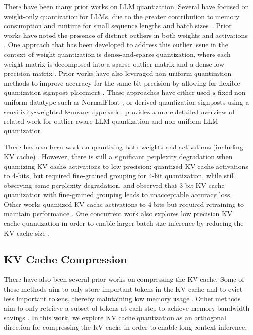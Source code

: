 There have been many prior works on LLM quantization. Several have focused on weight-only quantization for LLMs, due to the greater contribution to memory consumption and runtime for small sequence lengths and batch sizes~\cite{lin2023awq,dettmers2023spqr,kim2023squeezellm}. Prior works have noted the presence of distinct outliers in both weights and activations \cite{dettmers2022llm,dettmers2023spqr,kim2023squeezellm}. One approach that has been developed to address this outlier issue in the context of weight quantization is dense-and-sparse quantization, where each weight matrix is decomposed into a sparse outlier matrix and a dense low-precision matrix \cite{dettmers2023spqr,kim2023squeezellm}. Prior works have also leveraged non-uniform quantization methods to improve accuracy for the same bit precision by allowing for flexible quantization signpost placement \cite{kim2023squeezellm,dettmers2023qlora}. These approaches have either used a fixed non-uniform datatype such as NormalFloat \cite{dettmers2023qlora}, or derived quantization signposts using a sensitivity-weighted k-means approach \cite{kim2023squeezellm}.
 provides a more detailed overview of related work for outlier-aware LLM quantization and non-uniform  LLM quantization.

There has also been work on quantizing both weights and activations (including KV cache) \cite{xiao2023smoothquant,shao2023omniquant}. However, there is still a significant perplexity degradation when quantizing KV cache activations to low precision; \cite{sheng2023flexgen,zhao2023atom} quantized KV cache activations to 4-bits, but required fine-grained grouping for 4-bit quantization, while still observing some perplexity degradation, and \cite{sheng2023flexgen} observed that 3-bit KV cache quantization with fine-grained grouping leads to unacceptable accuracy loss. Other works quantized KV cache activations to 4-bits but required retraining to maintain performance \cite{liu2023llmqat}. One concurrent work also explores low precision KV cache quantization in order to enable larger batch size inference by reducing the KV cache size \cite{kivi}.

\subsection{KV Cache Compression}

There have also been several prior works on compressing the KV cache. Some of these methods aim to only store important tokens in the KV cache and to evict less important tokens, thereby maintaining low memory usage \cite{liu2023scissorhands,zhang2023h,ge2023model,li2024snapkv}. Other methods aim to only retrieve a subset of tokens at each step to achieve memory bandwidth savings  \cite{ribar2023sparq}. In this work, we explore KV cache quantization as an orthogonal direction for compressing the KV cache in order to enable long context inference.

